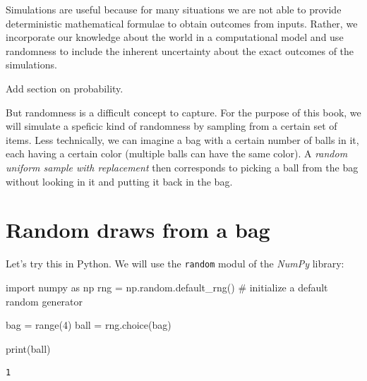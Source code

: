 \documentclass[
  a4paperpaper,
  ,captions=tableheading
]{scrbook}
\newenvironment{Shaded}{\begin{snugshade}}{\end{snugshade}}
\newcommand{\BuiltInTok}[1]{\textcolor[rgb]{0.00,0.23,0.31}{#1}}
\newcommand{\CommentTok}[1]{\textcolor[rgb]{0.37,0.37,0.37}{#1}}
\newcommand{\DecValTok}[1]{\textcolor[rgb]{0.68,0.00,0.00}{#1}}
\newcommand{\ImportTok}[1]{\textcolor[rgb]{0.00,0.46,0.62}{#1}}
\newcommand{\NormalTok}[1]{\textcolor[rgb]{0.00,0.23,0.31}{#1}}
\newcommand{\OperatorTok}[1]{\textcolor[rgb]{0.37,0.37,0.37}{#1}}
\begin{document}
Simulations are useful because for many situations we are not able to
provide deterministic mathematical formulae to obtain outcomes from
inputs. Rather, we incorporate our knowledge about the world in a
computational model and use randomness to include the inherent
uncertainty about the exact outcomes of the simulations.

\begin{tcolorbox}[enhanced jigsaw, arc=.35mm, left=2mm, colback=white, leftrule=.75mm, breakable, toprule=.15mm, opacityback=0, bottomrule=.15mm, rightrule=.15mm]

Add section on probability.

\end{tcolorbox}

But randomness is a difficult concept to capture. For the purpose of
this book, we will simulate a speficic kind of randomness by sampling
from a certain set of items. Less technically, we can imagine a bag with
a certain number of balls in it, each having a certain color (multiple
balls can have the same color). A \emph{random uniform sample with
replacement} then corresponds to picking a ball from the bag without
looking in it and putting it back in the bag.

\hypertarget{random-draws-from-a-bag}{%
\section{Random draws from a bag}\label{random-draws-from-a-bag}}

Let's try this in Python. We will use the \texttt{random} modul of the
\emph{NumPy} library:

\begin{Shaded}
\begin{Highlighting}[]
\ImportTok{import}\NormalTok{ numpy }\ImportTok{as}\NormalTok{ np}
\NormalTok{rng }\OperatorTok{=}\NormalTok{ np.random.default\_rng() }\CommentTok{\# initialize a default random generator}

\NormalTok{bag }\OperatorTok{=} \BuiltInTok{range}\NormalTok{(}\DecValTok{4}\NormalTok{)}
\NormalTok{ball }\OperatorTok{=}\NormalTok{ rng.choice(bag)}

\BuiltInTok{print}\NormalTok{(ball)}
\end{Highlighting}
\end{Shaded}

\begin{verbatim}
1
\end{verbatim}
\end{document}
